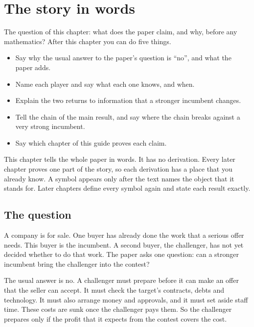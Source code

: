 \chapter{The story in words}\label{ch:story}

\begin{chapterplan}
The question of this chapter: what does the paper claim, and why, before any mathematics?
After this chapter you can do five things.
\begin{itemize}
\item Say why the usual answer to the paper's question is ``no'', and what the paper adds.
\item Name each player and say what each one knows, and when.
\item Explain the two returns to information that a stronger incumbent changes.
\item Tell the chain of the main result, and say where the chain breaks against a very strong incumbent.
\item Say which chapter of this guide proves each claim.
\end{itemize}
\end{chapterplan}

This chapter tells the whole paper in words. It has no derivation. Every later chapter proves one part of the story, so each derivation has a place that you already know. A symbol appears only after the text names the object that it stands for. Later chapters define every symbol again and state each result exactly.

\section{The question}\label{sec:story-question}

A company is for sale. One buyer has already done the work that a serious offer needs. This buyer is the incumbent. A second buyer, the challenger, has not yet decided whether to do that work. The paper asks one question: can a stronger incumbent bring the challenger into the contest?

The usual answer is no. A challenger must prepare before it can make an offer that the seller can accept. It must check the target's contracts, debts and technology. It must also arrange money and approvals, and it must set aside staff time. These costs are sunk once the challenger pays them. So the challenger prepares only if the profit that it expects from the contest covers the cost.

